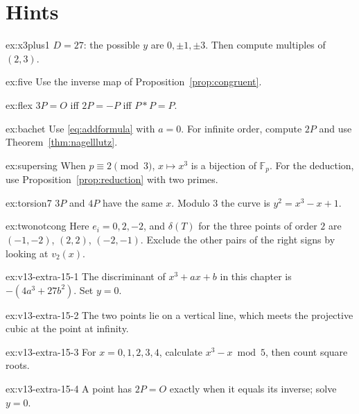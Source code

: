 \section{Hints}

\begin{hint}{ex:x3plus1}
$D=27$: the possible $y$ are $0,\pm1,\pm3$. Then compute multiples of $(2,3)$.
\end{hint}
\begin{hint}{ex:five}
Use the inverse map of Proposition~\ref{prop:congruent}.
\end{hint}
\begin{hint}{ex:flex}
$3P=O$ iff $2P=-P$ iff $P*P=P$.
\end{hint}
\begin{hint}{ex:bachet}
Use \eqref{eq:addformula} with $a=0$. For infinite order, compute $2P$ and use Theorem~\ref{thm:nagelllutz}.
\end{hint}
\begin{hint}{ex:supersing}
When $p\equiv2\pmod3$, $x\mapsto x^3$ is a bijection of $\mathbb F_p$. For the deduction, use Proposition~\ref{prop:reduction} with two primes.
\end{hint}
\begin{hint}{ex:torsion7}
$3P$ and $4P$ have the same $x$. Modulo $3$ the curve is $y^2=x^3-x+1$.
\end{hint}
\begin{hint}{ex:twonotcong}
Here $e_i=0,2,-2$, and $\delta(T)$ for the three points of order $2$ are $(-1,-2)$, $(2,2)$, $(-2,-1)$. Exclude the other pairs of the right signs by looking at
$v_2(x)$.
\end{hint}

\begin{hint}{ex:v13-extra-15-1}
The discriminant of $x^3+ax+b$ in this chapter is $-(4a^3+27b^2)$. Set $y=0$.
\end{hint}

\begin{hint}{ex:v13-extra-15-2}
The two points lie on a vertical line, which meets the projective cubic at the point at infinity.
\end{hint}

\begin{hint}{ex:v13-extra-15-3}
For $x=0,1,2,3,4$, calculate $x^3-x\bmod5$, then count square roots.
\end{hint}

\begin{hint}{ex:v13-extra-15-4}
A point has $2P=O$ exactly when it equals its inverse; solve $y=0$.
\end{hint}

